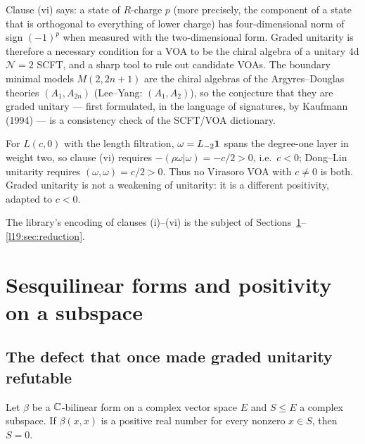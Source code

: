 \begin{physics}
Clause (vi) says: a state of $R$-charge $p$ (more precisely, the component of a state that is
orthogonal to everything of lower charge) has four-dimensional norm of sign $(-1)^p$ when measured
with the two-dimensional form. Graded unitarity is therefore a necessary condition for a VOA to be
the chiral algebra of a unitary 4d $\mathcal N=2$ SCFT, and a sharp tool to rule out candidate VOAs.
The boundary minimal models $M(2,2n+1)$ are the chiral algebras of the Argyres--Douglas theories
$(A_1,A_{2n})$ (Lee--Yang: $(A_1,A_2)$), so the conjecture that they are graded unitary --- first
formulated, in the language of signatures, by Kaufmann (1994) --- is a consistency check of the
SCFT/VOA dictionary.
\end{physics}

\begin{remark}\label{l19:rem:incompatible}
For $L(c,0)$ with the length filtration, $\omega = L_{-2}\mathbf{1}$ spans the degree-one layer in
weight two, so clause (vi) requires $-(\rho\omega|\omega) = -c/2 >0$, i.e.\ $c<0$; Dong--Lin
unitarity requires $(\omega,\omega) = c/2>0$. Thus no Virasoro VOA with $c\ne0$ is both. Graded
unitarity is not a weakening of unitarity: it is a different positivity, adapted to $c<0$.
\end{remark}

The library's encoding of clauses (i)--(vi) is the subject of
Sections~\ref{l19:sec:sesq}--\ref{l19:sec:reduction}.

\section{Sesquilinear forms and positivity on a subspace}\label{l19:sec:sesq}

\subsection{The defect that once made graded unitarity refutable}

\begin{theorem}\label{l19:thm:bilpos}
Let $\beta$ be a ${\mathbb{C}}$-bilinear form on a complex vector space $E$ and $S\le E$ a complex subspace.
If $\beta(x,x)$ is a positive real number for every nonzero $x\in S$, then $S = 0$.
\end{theorem}

